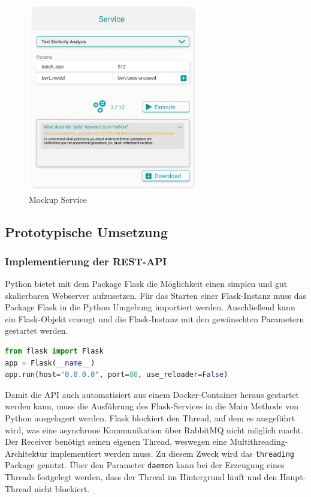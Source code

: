 \begin{figure}[H]
  \centering
    \includegraphics[width = 7.5cm]{bilder/mockupService}
    \caption{Mockup Service}
\end{figure}

\subsection{Prototypische Umsetzung}
\subsubsection{Implementierung der REST-API}
Python bietet mit dem Package Flask die Möglichkeit einen simplen und gut skalierbaren Webserver aufzusetzen. Für das Starten einer Flask-Instanz muss das Package Flask in die Python Umgebung importiert werden. Anschließend kann ein Flask-Objekt erzeugt und die Flask-Instanz mit den gewünschten Parametern gestartet werden.

\begin{lstlisting}[language=Python, caption={Aufsetzen einer Flask-Instanz}]
from flask import Flask
app = Flask(__name__)
app.run(host="0.0.0.0", port=80, use_reloader=False)
\end{lstlisting}

Damit die API auch automatisiert aus einem Docker-Container heraus gestartet werden kann, muss die Ausführung des Flask-Services in die Main Methode von Python ausgelagert werden. Flask blockiert den Thread, auf dem es ausgeführt wird, was eine asynchrone Kommunikation über RabbitMQ nicht möglich macht. Der Receiver benötigt seinen eigenen Thread, weswegen eine Multithreading-Architektur implementiert werden muss. Zu diesem Zweck wird das \texttt{threading} Package genutzt. Über den Parameter \texttt{daemon} kann bei der Erzeugung eines Threads festgelegt werden, dass der Thread im Hintergrund läuft und den Haupt-Thread nicht blockiert.

